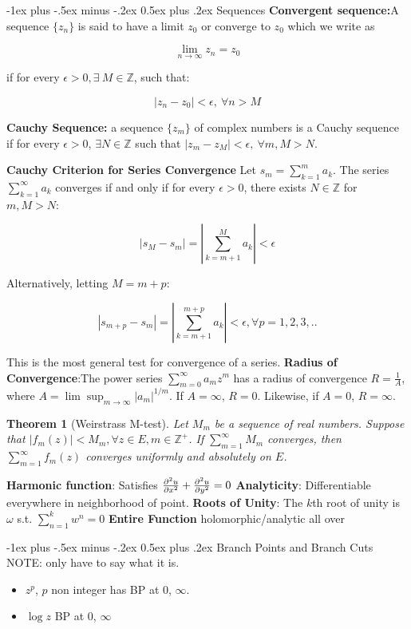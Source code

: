 \documentclass{article}
\makeatletter
\newtheorem{theorem}{Theorem}[section]
\theoremstyle{definition}
\renewcommand{\section}{\@startsection{section}{1}{0mm}%
	{-1ex plus -.5ex minus -.2ex}%
	{0.5ex plus .2ex}%
	{\normalfont\large\bfseries}}
\makeatother
\begin{document}
\begin{multicols}{3}
\section{Sequences}
\textbf{Convergent sequence:}A sequence $\{z_n\}$ is said to have a limit $z_0$ or converge to $z_0$ which we write as 
	
	$$\lim_{n\to\infty} z_n = z_0$$
	
	if for every $\epsilon > 0, \exists\ M \in  \mathbb{Z}$, such that:
	
	$$|z_n - z_0| < \epsilon,\ \forall n > M$$

\textbf{Cauchy Sequence:} a sequence $\{z_m\}$ of complex numbers is a Cauchy sequence if for every $\epsilon>0$, $\exists N \in \mathbb{Z}$ such that $|z_m - z_M| < \epsilon,\ \forall m, M>N$.

\textbf{Cauchy Criterion for Series Convergence} Let $s_m = \sum_{k=1}^{m}a_k$. The series $\sum_{k=1}^{\infty}a_k$ converges if and only if for every $\epsilon>0$, there exists $N \in \mathbb{Z}$ for $m, M>N$:

$$|s_M - s_m| = \left|\sum_{k=m+1}^{M}a_k\right| < \epsilon$$

Alternatively, letting $M = m+p$:

$$|s_{m+p} - s_m| = \left|\sum_{k=m+1}^{m+p}a_k\right| < \epsilon, \forall p = 1,2,3,..$$

This is the most general test for convergence of a series. 
\textbf{Radius of Convergence}:The power series $\sum_{m=0}^\infty a_m z^m$ has a radius of convergence $R = \frac{1}{A}$, where $A =\lim\sup_{m \to \infty } |a_m|^{1/m}$. If $A = \infty$, $R = 0$. Likewise, if $A=0$, $R = \infty$.

\begin{theorem}[Weirstrass M-test]
	Let $M_m$ be a sequence of real numbers. Suppose that $|f_m(z)| < M_m, \forall z \in E, m\in \mathbb{Z}^+$.  If $\sum_{m=1}^\infty M_m$ converges, then $\sum_{m=1}^\infty f_m(z)$ converges uniformly and absolutely on $E$. 
\end{theorem}
 
\textbf{Harmonic function}: Satisfies $\pdv{^2u}{x^2} + \pdv{^2u}{y^2} = 0$
\textbf{Analyticity}: Differentiable everywhere in neighborhood of point.
\textbf{Roots of Unity}: The $k$th root of unity is $\omega$ s.t. $\sum_{n=1}^{k} w^n =0$
\textbf{Entire Function} holomorphic/analytic all over 


\section{Branch Points and Branch Cuts}
NOTE: only have to say what it is. 
\begin{itemize}
	\item $z^p$, $p$ non integer has BP at 0, $\infty$.
	\item $\log z$ BP at 0, $\infty$
\end{itemize}


\end{multicols}
\end{document}
